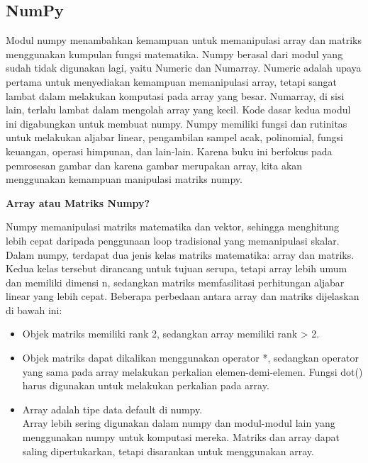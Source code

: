 \documentclass[
  letterpaper,
  DIV=11,
  numbers=noendperiod]{scrreprt}
\providecommand{\tightlist}{%
  \setlength{\itemsep}{0pt}\setlength{\parskip}{0pt}}\usepackage{longtable,booktabs,array}
\begin{document}
\hypertarget{numpy}{%
\subsection*{NumPy}\label{numpy}}

Modul numpy menambahkan kemampuan untuk memanipulasi array dan matriks
menggunakan kumpulan fungsi matematika. Numpy berasal dari modul yang
sudah tidak digunakan lagi, yaitu Numeric dan Numarray. Numeric adalah
upaya pertama untuk menyediakan kemampuan memanipulasi array, tetapi
sangat lambat dalam melakukan komputasi pada array yang besar. Numarray,
di sisi lain, terlalu lambat dalam mengolah array yang kecil. Kode dasar
kedua modul ini digabungkan untuk membuat numpy. Numpy memiliki fungsi
dan rutinitas untuk melakukan aljabar linear, pengambilan sampel acak,
polinomial, fungsi keuangan, operasi himpunan, dan lain-lain. Karena
buku ini berfokus pada pemrosesan gambar dan karena gambar merupakan
array, kita akan menggunakan kemampuan manipulasi matriks numpy.

\textbf{Array atau Matriks Numpy?}

Numpy memanipulasi matriks matematika dan vektor, sehingga menghitung
lebih cepat daripada penggunaan loop tradisional yang memanipulasi
skalar. Dalam numpy, terdapat dua jenis kelas matriks matematika: array
dan matriks. Kedua kelas tersebut dirancang untuk tujuan serupa, tetapi
array lebih umum dan memiliki dimensi n, sedangkan matriks memfasilitasi
perhitungan aljabar linear yang lebih cepat. Beberapa perbedaan antara
array dan matriks dijelaskan di bawah ini:

\begin{itemize}
\tightlist
\item
  Objek matriks memiliki rank 2, sedangkan array memiliki rank
  \textgreater{} 2.\\
\item
  Objek matriks dapat dikalikan menggunakan operator *, sedangkan
  operator yang sama pada array melakukan perkalian elemen-demi-elemen.
  Fungsi dot() harus digunakan untuk melakukan perkalian pada array.\\
\item
  Array adalah tipe data default di numpy.\\
  Array lebih sering digunakan dalam numpy dan modul-modul lain yang
  menggunakan numpy untuk komputasi mereka. Matriks dan array dapat
  saling dipertukarkan, tetapi disarankan untuk menggunakan array.
\end{itemize}
\end{document}
